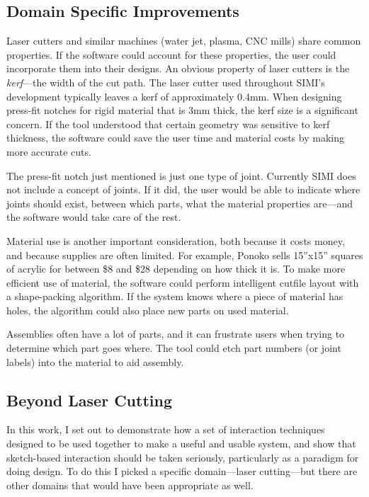 \subsection{Domain Specific Improvements}

Laser cutters and similar machines (water jet, plasma, CNC mills)
share common properties. If the software could account for these
properties, the user could incorporate them into their designs. An
obvious property of laser cutters is the \textit{kerf}---the width of
the cut path. The laser cutter used throughout SIMI's development
typically leaves a kerf of approximately 0.4mm. When designing
press-fit notches for rigid material that is 3mm thick, the kerf size
is a significant concern. If the tool understood that certain geometry
was sensitive to kerf thickness, the software could save the user time
and material costs by making more accurate cuts.

The press-fit notch just mentioned is just one type of
joint. Currently SIMI does not include a concept of joints. If it did,
the user would be able to indicate where joints should exist, between
which parts, what the material properties are---and the software would
take care of the rest.

Material use is another important consideration, both because it costs
money, and because supplies are often limited. For example, Ponoko
sells 15''x15'' squares of acrylic for between \$8 and \$28 depending
on how thick it is. To make more efficient use of material, the
software could perform intelligent cutfile layout with a shape-packing
algorithm. If the system knows where a piece of material has holes,
the algorithm could also place new parts on used material.

Assemblies often have a lot of parts, and it can frustrate users when
trying to determine which part goes where. The tool could etch part
numbers (or joint labels) into the material to aid assembly.

\subsection{Beyond Laser Cutting}

In this work, I set out to demonstrate how a set of interaction
techniques designed to be used together to make a useful and usable
system, and show that sketch-based interaction should be taken
seriously, particularly as a paradigm for doing design. To do this I
picked a specific domain---laser cutting---but there are other domains
that would have been appropriate as well. 

